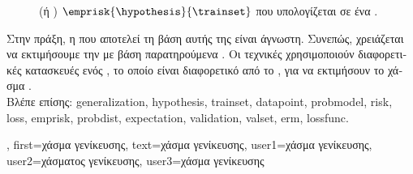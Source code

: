 {{\begin{figure}[H]
{			 (\foreignlanguage{greek}{ή} ) 
			$\emprisk{\hypothesis}{\trainset}$ \foreignlanguage{greek}{που υπολογίζεται σε ένα} .}
		\end{figure}
		\foreignlanguage{greek}{Στην πράξη, η}  \foreignlanguage{greek}{που αποτελεί τη βάση αυτής της} 
		 \foreignlanguage{greek}{είναι άγνωστη. Συνεπώς, χρειάζεται να εκτιμήσουμε την}
	  	 \foreignlanguage{greek}{με βάση παρατηρούμενα} . \foreignlanguage{greek}{Οι 
		τεχνικές}  \foreignlanguage{greek}{χρησιμοποιούν διαφορετικές κατασκευές ενός} , 
		\foreignlanguage{greek}{το οποίο είναι διαφορετικό από το} , \foreignlanguage{greek}{για να εκτιμήσουν 
		το χάσμα} .
		\\
		\foreignlanguage{greek}{Βλέπε επίσης:} \gls{generalization}, \gls{hypothesis}, \gls{trainset}, \gls{datapoint}, \gls{probmodel}, \gls{risk}, 
		\gls{loss}, \gls{emprisk}, \gls{probdist}, \gls{expectation}, \gls{validation}, \gls{valset}, \gls{erm}, \gls{lossfunc}.}, 
	first={\foreignlanguage{greek}{χάσμα γενίκευσης}}, 
	text={\foreignlanguage{greek}{χάσμα γενίκευσης}},
	user1={\foreignlanguage{greek}{χάσμα γενίκευσης}}, %
  	user2={\foreignlanguage{greek}{χάσματος γενίκευσης}}, %
	user3={\foreignlanguage{greek}{χάσμα γενίκευσης}} %
}


